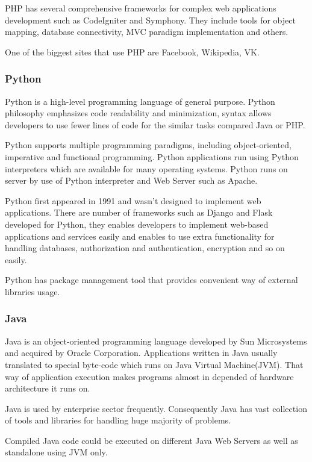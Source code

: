 \documentclass[thesis=M,english]{FITthesis}[2012/10/20]
\begin{document}
PHP has several comprehensive frameworks for complex web applications development such as CodeIgniter and Symphony. They include tools for object mapping, database connectivity, MVC paradigm implementation and others.

One of the biggest sites that use PHP are Facebook, Wikipedia, VK.

\subsubsection{Python}

Python is a high-level programming language of general purpose. Python philosophy emphasizes code readability and minimization, syntax allows developers to use fewer lines of code for the similar tasks compared Java or PHP. 

Python supports multiple programming paradigms, including object-oriented, imperative and functional programming. Python applications run using Python interpreters which are available for many operating systems. Python runs on server by use of Python interpreter and Web Server such as Apache.

Python first appeared in 1991 and wasn't designed to implement web applications. There are number of frameworks such as Django and Flask developed for Python, they enables developers to implement web-based applications and services easily and enables to use extra functionality for handling databases, authorization and authentication, encryption and so on easily.

Python has package management tool that provides convenient way of external libraries usage.
 

\subsubsection{Java}

Java is an object-oriented programming language developed by Sun Microsystems and acquired by Oracle Corporation. Applications written in Java usually translated to special byte-code which runs on Java Virtual Machine(JVM). That way of application execution makes programs almost in depended of hardware architecture it runs on.

Java is used by enterprise sector frequently. Consequently Java has vast collection of tools and libraries for handling huge majority of problems.

Compiled Java code could be executed on different Java Web Servers as well as standalone using JVM only.
\end{document}
